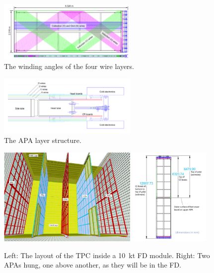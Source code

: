 \begin{figure}
    \centering
    \includegraphics[width=0.6\textwidth]{figs/WP3/WireWindingAngles.png}
    \caption{The winding angles of the four wire layers.}
    \label{fig:APADiagram}
\end{figure}

\begin{figure}
    \centering
    \includegraphics[width=0.6\textwidth]{figs/WP3/WireLayers.png}
    \caption{The APA layer structure.}
    \label{fig:APALayers}
\end{figure}

\begin{figure}
    \centering
    \includegraphics[width=0.6\textwidth]{figs/WP3/TPCDiagram.png}
    \includegraphics[width=0.35\textwidth]{figs/WP3/HangingAPAs.png}
    \caption{Left: The layout of the TPC inside a \SI{10}{\kilo\tonne} FD module. Right: Two APAs hung, one above another, as they will be in the FD.}
    \label{fig:APAsInTheDetector}
\end{figure}

